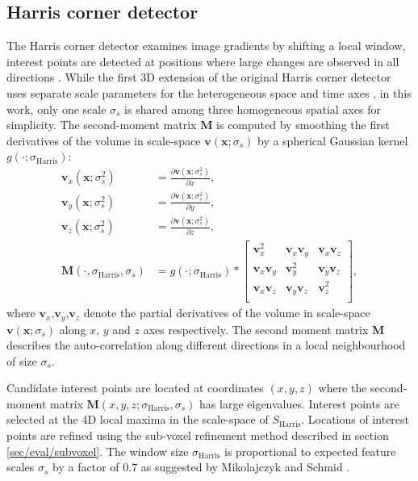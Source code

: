 \subsection{Harris corner detector}
The Harris corner detector examines image gradients by shifting a local window, interest points are detected at positions where large changes are observed in all directions \cite{Harris1988}. While the first 3D extension of the original Harris corner detector uses separate scale parameters for the heterogeneous space and time axes \cite{Laptev2005}, in this work, only one scale $\sigma_s$ is shared among three homogeneous spatial axes for simplicity.  
The second-moment matrix $\mathbf{M}$ is computed by smoothing the first derivatives of the volume in scale-space $\mathbf{v}(\mathbf{x};\sigma_s)$ by a spherical Gaussian kernel $g(\cdot;\sigma_\textrm{Harris})$: 
\begin{equation}
	\begin{aligned}
		\mathbf{v}_x(\mathbf{x};\sigma^2_s) & = \displaystyle\frac{\partial \mathbf{v}(\mathbf{x};\sigma^2_s)}{\partial x}, \\
		\mathbf{v}_y(\mathbf{x};\sigma^2_s) & = \displaystyle\frac{\partial \mathbf{v}(\mathbf{x};\sigma^2_s)}{\partial y}, \\
		\mathbf{v}_z(\mathbf{x};\sigma^2_s) & = \displaystyle\frac{\partial \mathbf{v}(\mathbf{x};\sigma^2_s)}{\partial z}, \\ 
		\mathbf{M}(\cdot, \sigma_\textrm{Harris}, \sigma_s) & = g(\cdot;\sigma_\textrm{Harris}) \ast \left[
			\begin{array}{ccc}
				\mathbf{v}^2_x & \mathbf{v}_x\mathbf{v}_y & \mathbf{v}_x\mathbf{v}_z \\
				\mathbf{v}_x\mathbf{v}_y & \mathbf{v}_y^2 & \mathbf{v}_y\mathbf{v}_z \\
				\mathbf{v}_x\mathbf{v}_z & \mathbf{v}_y\mathbf{v}_z & \mathbf{v}^2_z \\
			\end{array}
		\right],
	\end{aligned}
	\label{eqn/eval/harris_2ndmoment}
\end{equation}
where $\mathbf{v}_x$,$\mathbf{v}_y$,$\mathbf{v}_z$ denote the partial derivatives of the volume in scale-space $\mathbf{v}(\mathbf{x};\sigma_s)$ along $x$, $y$ and $z$ axes respectively. The second moment matrix $\mathbf{M}$ describes the auto-correlation along different directions in a local neighbourhood of size $\sigma_s$. 

Candidate interest points are located at coordinates $(x,y,z)$ where the second-moment matrix $\mathbf{M}(x,y,z; \sigma_\textrm{Harris}, \sigma_s)$ has large eigenvalues. Interest points are selected at the 4D local maxima in the scale-space of $S_{\textrm{Harris}}$. Locations of interest points are refined using the sub-voxel refinement method described in section \ref{sec/eval/subvoxel}. The window size $\sigma_\textrm{Harris}$ is proportional to expected feature scales $\sigma_s$ by a factor of $0.7$ as suggested by Mikolajczyk and Schmid \cite{Mikolajczyk2004}. 

